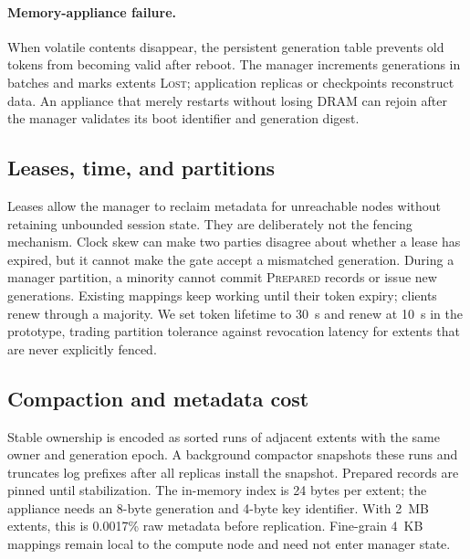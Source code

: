\paragraph{Memory-appliance failure.}
When volatile contents disappear, the persistent generation table prevents old
tokens from becoming valid after reboot. The manager increments generations in
batches and marks extents \textsc{Lost}; application replicas or checkpoints
reconstruct data. An appliance that merely restarts without losing DRAM can
rejoin after the manager validates its boot identifier and generation digest.

\subsection{Leases, time, and partitions}

Leases allow the manager to reclaim metadata for unreachable nodes without
retaining unbounded session state. They are deliberately not the fencing
mechanism. Clock skew can make two parties disagree about whether a lease has
expired, but it cannot make the gate accept a mismatched generation. During a
manager partition, a minority cannot commit \textsc{Prepared} records or issue
new generations. Existing mappings keep working until their token expiry;
clients renew through a majority. We set token lifetime to 30~s and renew at
10~s in the prototype, trading partition tolerance against revocation latency
for extents that are never explicitly fenced.

\subsection{Compaction and metadata cost}

Stable ownership is encoded as sorted runs of adjacent extents with the same
owner and generation epoch. A background compactor snapshots these runs and
truncates log prefixes after all replicas install the snapshot. Prepared
records are pinned until stabilization. The in-memory index is 24 bytes per
extent; the appliance needs an 8-byte generation and 4-byte key identifier.
With 2~MB extents, this is 0.0017\% raw metadata before replication. Fine-grain
4~KB mappings remain local to the compute node and need not enter manager state.
